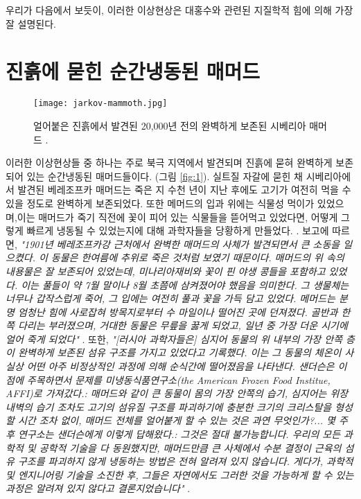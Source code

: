 \documentclass[10pt,twocolumn,letterpaper]{article}
\begin{document}
우리가 다음에서 보듯이, 이러한 이상현상은  대홍수와 관련된 지질학적 힘에 의해 가장 잘 설명된다.

\section{진흙에 묻힌 순간냉동된  매머드}

\begin{figure}[t]
\begin{center}
   \texttt{[image: jarkov-mammoth.jpg]}
\end{center}
   \caption{얼어붙은 진흙에서 발견된 20,000년 전의 완벽하게 보존된 시베리아 매머드 \cite{51}.}
\label{fig:1}
\label{fig:onecol}
\end{figure}

이러한 이상현상들 중 하나는 주로 북극 지역에서 발견되며 진흙에 묻혀 완벽하게 보존되어 있는 순간냉동된 매머드들이다. (그림 \ref{fig:1}). 실트질 자갈에 묻힌 채 시베리아에서 발견된 베레조프카 매머드는 죽은 지 수천 년이 지난 후에도 고기가 여전히 먹을 수 있을 정도로 완벽하게 보존되었다. 또한   메머드의 입과 위에는 식물성 먹이가 있었으며,이는 매머드가 죽기 직전에 꽃이 피어 있는 식물들을 뜯어먹고 있었다면, 어떻게 그렇게 빠르게 냉동될 수 있었는지에 대해 과학자들을 당황하게 만들었다. \cite{17}. 보고에 따르면, \textit{"1901년 베레조프카강 근처에서 완벽한 매머드의 사체가 발견되면서 큰 소동을 일으켰다. 이 동물은 한여름에 추위로  죽은 것처럼 보였기 때문이다. 매머드의 위 속의 내용물은 잘 보존되어 있었는데, 미나리아재비와 꽃이 핀 야생 콩들을 포함하고 있었다. 이는 풀들이 약 7월 말이나 8월 초쯤에 삼켜졌어야 했음을 의미한다. 그 생물체는 너무나 갑작스럽게 죽어, 그 입에는 여전히 풀과 꽃을 가득 담고 있었다. 메머드는 분명 엄청난 힘에 사로잡혀 방목지로부터 수 마일이나 떨어진 곳에 던져졌다. 골반과 한쪽 다리는 부러졌으며, 거대한 동물은 무릎을 꿇게 되었고, 일년 중 가장 더운 시기에 얼어 죽게 되었다"} \cite{18}. 또한, \textit{"[러시아 과학자들은] 심지어 동물의 위 내부의 가장 안쪽 층이 완벽하게 보존된 섬유 구조를 가지고 있었다고 기록했다. 이는 그 동물의 체온이 사실상 어떤 아주 비정상적인 과정에 의해 순식간에 떨어졌음을 나타낸다. 샌더슨은 이 점에 주목하면서 문제를 미냉동식품연구소(the American Frozen Food Institue, AFFI)로 가져갔다.: 매머드와 같이 큰 동물이 몸의 가장 안쪽의 습기, 심지어는 위장 내벽의 습기 조차도  고기의 섬유질 구조를 파괴하기에 충분한 크기의 크리스탈을 형성할 시간 조차 없이, 매머드 전체를 얼어붙게 할 수 있는 것은 과연 무엇인가?... 몇 주 후 연구소는 샌더슨에게 이렇게 답해왔다.: 그것은 절대 불가능합니다. 우리의 모든 과학적 및 공학적 기술을 다 동원했지만, 매머드만큼 큰 사체에서 수분 결정이 근육의 섬유 구조를 파괴하지 않게 냉동하는 방법은 전혀 알려져 있지 않습니다. 게다가, 과학적 및 엔지니어링 기술을 소진한 후, 그들은 자연에서도 그러한 것을 가능하게 할 수 있는 과정은 알려져 있지 않다고 결론지었습니다"} \cite{19}.
\end{document}
